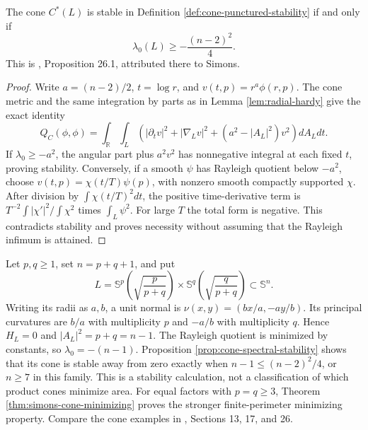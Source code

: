 \begin{proposition}\label{prop:cone-spectral-stability}
The cone $C^*(L)$ is stable in Definition \ref{def:cone-punctured-stability} if and only if
\[
 \lambda_0(L)\geq-\frac{(n-2)^2}{4}.
\]
This is \cite{ChMin}, Proposition 26.1, attributed there to Simons.
\end{proposition}
\begin{proof}
Write $a=(n-2)/2$, $t=\log r$, and $v(t,p)=r^a\phi(r,p)$. The cone metric and the same integration by parts as in Lemma \ref{lem:radial-hardy} give the exact identity
\[
 Q_C(\phi,\phi)=\int_{\mathbb R}\int_L
 \left(|\partial_tv|^2+|\nabla_Lv|^2+(a^2-|A_L|^2)v^2\right)dA_Ldt.
\]
If $\lambda_0\geq-a^2$, the angular part plus $a^2v^2$ has nonnegative integral at each fixed $t$, proving stability. Conversely, if a smooth $\psi$ has Rayleigh quotient below $-a^2$, choose $v(t,p)=\chi(t/T)\psi(p)$, with nonzero smooth compactly supported $\chi$. After division by $\int\chi(t/T)^2dt$, the positive time-derivative term is $T^{-2}\int|\chi'|^2/\int\chi^2$ times $\int_L\psi^2$. For large $T$ the total form is negative. This contradicts stability and proves necessity without assuming that the Rayleigh infimum is attained.
\end{proof}

\begin{example}\label{ex:clifford-cone-stability}
Let $p,q\geq1$, set $n=p+q+1$, and put
\[
 L=\mathbb S^p\left(\sqrt{\frac p{p+q}}\right)
 \times\mathbb S^q\left(\sqrt{\frac q{p+q}}\right)\subset\mathbb S^n.
\]
Writing its radii as $a,b$, a unit normal is $\nu(x,y)=(bx/a,-ay/b)$. Its principal curvatures are $b/a$ with multiplicity $p$ and $-a/b$ with multiplicity $q$. Hence $H_L=0$ and $|A_L|^2=p+q=n-1$. The Rayleigh quotient is minimized by constants, so $\lambda_0=-(n-1)$. Proposition \ref{prop:cone-spectral-stability} shows that its cone is stable away from zero exactly when
$n-1\leq(n-2)^2/4$, or $n\geq7$ in this family. This is a stability calculation, not a classification of which product cones minimize area. For equal factors with $p=q\geq3$, Theorem \ref{thm:simons-cone-minimizing} proves the stronger finite-perimeter minimizing property. Compare the cone examples in \cite{ChMin}, Sections 13, 17, and 26.
\end{example}

